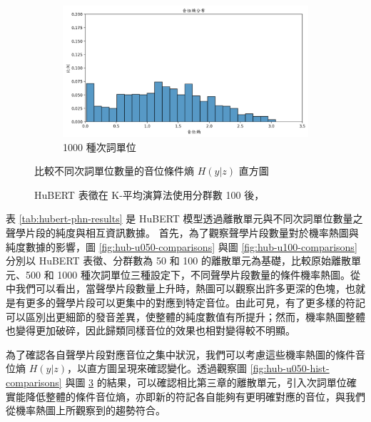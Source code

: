 {{{\begin{figure}
\begin{subfigure}{\textwidth}
                 \label{fig:hub-u100-ap0500-phnent-hist}
             \end{subfigure}
             \vfill
             \begin{subfigure}{\textwidth}
                 \centering
                 \includegraphics[width=\tempwidth]{figures/ch4figs/hub-u100-ap1000-phnent-hist.png}
                 \caption{1000 種次詞單位}
                 \label{fig:hub-u100-ap1000-phnent-hist}
             \end{subfigure}

             \caption{HuBERT 表徵在 K-平均演算法使用分群數 100 後，}
             比較不同次詞單位數量的音位條件熵 $H(y|z)$ 直方圖
             \label{fig:hub-u100-hist-comparisons}
        \end{figure}
    }
}


表 \ref{tab:hubert-phn-results} 是 HuBERT 模型透過離散單元與不同次詞單位數量之聲學片段的純度與相互資訊數據。
首先，為了觀察聲學片段數量對於機率熱圖與純度數據的影響，圖 \ref{fig:hub-u050-comparisons} 與圖 \ref{fig:hub-u100-comparisons} 分別以
HuBERT 表徵、分群數為 50 和 100 的離散單元為基礎，比較原始離散單元、500 和 1000 種次詞單位三種設定下，不同聲學片段數量的條件機率熱圖。從中我們可以看出，當聲學片段數量上升時，熱圖可以觀察出許多更深的色塊，也就是有更多的聲學片段可以更集中的對應到特定音位。由此可見，有了更多樣的符記可以區別出更細節的發音差異，使整體的純度數值有所提升；然而，機率熱圖整體也變得更加破碎，因此歸類同樣音位的效果也相對變得較不明顯。

        為了確認各自聲學片段對應音位之集中狀況，我們可以考慮這些機率熱圖的條件音位熵 $H(y|z)$，以直方圖呈現來確認變化。透過觀察圖 \ref{fig:hub-u050-hist-comparisons} 與圖 \ref{fig:hub-u100-hist-comparisons} 的結果，可以確認相比第三章的離散單元，引入次詞單位確實能降低整體的條件音位熵，亦即新的符記各自能夠有更明確對應的音位，與我們從機率熱圖上所觀察到的趨勢符合。
        

}
